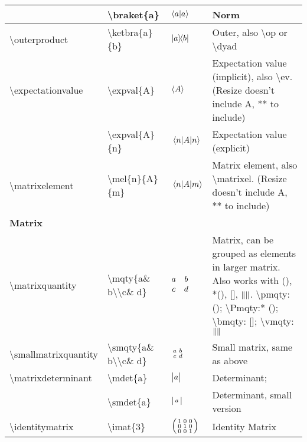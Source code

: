\documentclass{article}
\def\tbs{\textbackslash}
\begin{document}
\begin{longtable}{l||l|l|p{6cm}}
                          & \tbs braket\{a\}                 & $\braket{a}$             & Norm
\\ \hline
\tbs outerproduct         & \tbs ketbra\{a\}\{b\}            & $\ketbra{a}{b}$          & Outer, also \tbs op or \tbs dyad
\\ \hline
\tbs expectationvalue     & \tbs expval\{A\}                 & $\expval{A}$             & Expectation value (implicit), also \tbs ev. (Resize doesn't include A, ** to include)
\\ \hline
                          & \tbs expval\{A\}\{n\}            & $\expval{A}{n}$          & Expectation value (explicit)
\\ \hline
\tbs matrixelement        & \tbs mel\{n\}\{A\}\{m\}          & $\mel{n}{A}{m}$          & Matrix element, also \tbs matrixel. (Resize doesn't include A, ** to include)
\\ \hline \hline
\textbf{Matrix}           &                                  &                          &
\\ \hline
\tbs matrixquantity       & \tbs mqty\{a\& b\tbs \tbs c\& d\}& $\begin{matrix}\mqty{a&b\\c&d}\end{matrix}$        & Matrix, can be grouped as elements in larger matrix. Also works with (), *(), [], $\norm{}$. \tbs pmqty: (); \tbs Pmqty:* (); \tbs bmqty: []; \tbs vmqty: $\norm{}$
\\ \hline
\tbs smallmatrixquantity  & \tbs smqty\{a\& b\tbs \tbs c\& d\}& $\begin{matrix}\smqty{a&b\\c&d}\end{matrix}$       & Small matrix, same as above
\\ \hline
\tbs matrixdeterminant    & \tbs mdet\{a\}                   & $\begin{matrix}\mdet{a}\end{matrix}$               & Determinant;
\\ \hline
                          & \tbs smdet\{a\}                  & $\begin{matrix}\smdet{a}\end{matrix}$              & Determinant, small version
\\ \hline
\tbs identitymatrix       & \tbs imat\{3\}                   & $\begin{matrix}\smqty(\imat{3})\end{matrix}$       & Identity Matrix
\\ \hline

\end{longtable}
\end{document}
